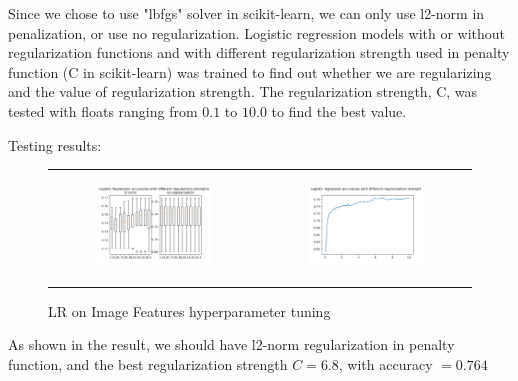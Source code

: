 \documentclass[11.5pt]{article}
\begin{document}
\begin{enumerate}
\begin{itemize}
\begin{enumerate}
                Since we chose to use "lbfgs" solver in scikit-learn, we can only use l2-norm in penalization, or use no regularization.
                Logistic regression models with or without regularization functions and with different regularization strength used in penalty function (C in scikit-learn) was trained to find out whether we are regularizing and the value of regularization strength.
                The regularization strength, C, was tested with floats ranging from $0.1$ to $10.0$ to find the best value.

                Testing results:

                \begin{figure}[h!]
                    \centering
                    \begin{tabular}[c]{cc}
                        \begin{subfigure}[h]{0.4\linewidth}
                            \centering
                            \includegraphics[width=0.75\linewidth]{images/log_reg_hyperparam_penalty.png}
                        \end{subfigure} &
                        \begin{subfigure}[h]{0.4\linewidth}
                            \centering
                            \includegraphics[width=0.75\linewidth]{images/log_reg_hyperparam_c.png}
                        \end{subfigure}
                    \end{tabular}
                    \caption{LR on Image Features hyperparameter tuning}
                \end{figure}
                As shown in the result, we should have l2-norm regularization in penalty function, and the best regularization strength $C= 6.8$, with accuracy $= 0.764$


\end{enumerate}
\end{itemize}
\end{enumerate}
\end{document}
